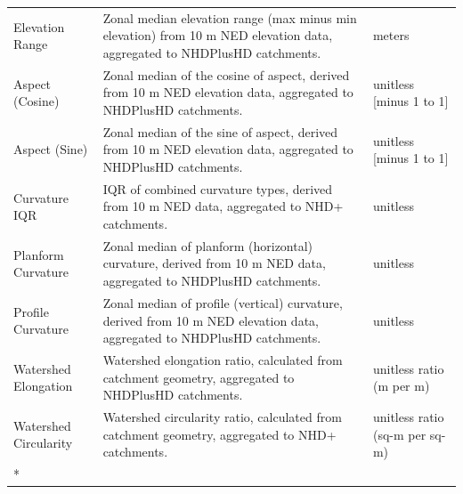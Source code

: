 \documentclass[
  10pt,
]{article}
\begin{document}
\begin{longtable}[t]{lp{8cm}l}
Elevation Range & Zonal median elevation range (max minus min elevation) from 10 m NED
elevation data, aggregated to NHDPlusHD catchments. & meters\\
Aspect (Cosine) & Zonal median of the cosine of aspect, derived from 10 m NED elevation
data, aggregated to NHDPlusHD catchments. & unitless [minus 1 to 1]\\
Aspect (Sine) & Zonal median of the sine of aspect, derived from 10 m NED elevation
data, aggregated to NHDPlusHD catchments. & unitless [minus 1 to 1]\\
\addlinespace
Curvature IQR & IQR of combined curvature types, derived from 10 m NED data,
aggregated to NHD+ catchments. & unitless\\
Planform Curvature & Zonal median of planform (horizontal) curvature, derived from 10 m NED
data, aggregated to NHDPlusHD catchments. & unitless\\
Profile Curvature & Zonal median of profile (vertical) curvature, derived from 10 m NED
elevation data, aggregated to NHDPlusHD catchments. & unitless\\
Watershed Elongation & Watershed elongation ratio, calculated from catchment geometry,
aggregated to NHDPlusHD catchments. & unitless ratio (m per m)\\
Watershed Circularity & Watershed circularity ratio, calculated from catchment geometry,
aggregated to NHD+ catchments. & unitless ratio (sq-m per sq-m)\\*
\end{longtable}
\endgroup{}

\vspace{0.5cm}

\begingroup\fontsize{8}{10}\selectfont
\end{document}

